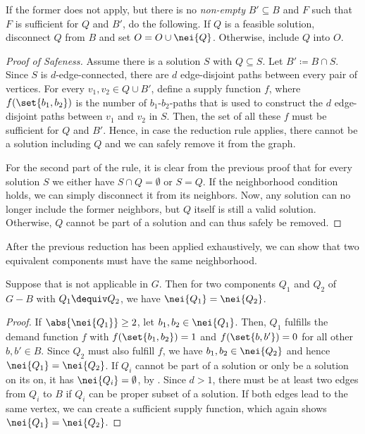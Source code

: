 \begin{lemma}
\begin{lemma}
\begin{lemma}
\begin{lemma}
\begin{lemma}
\begin{theorem}
\begin{reduction*}
\begin{reduction*}[$\star$]
  If the former does not apply, but there is no \emph{non-empty} $B' \subseteq B$ and $F$ such that $F$ is sufficient for $Q$ and $B'$, do the following. If $Q$ is a feasible solution, disconnect $Q$ from $B$ and set $O = O \cup \nei{Q}$. Otherwise, include $Q$ into $O$.
\end{reduction*}
\iflong
\begin{proof}[Proof of Safeness]
  Assume there is a solution $S$ with $Q \subseteq S$. Let $B' \coloneqq B \cap S$. Since $S$ is $d$-edge-connected, there are $d$ edge-disjoint paths between every pair of vertices. For every $v_1, v_2 \in Q \cup B'$, define a supply function $f$, where $f(\set{b_1, b_2})$ is the number of $b_1$-$b_2$-paths that is used to construct the $d$ edge-disjoint paths between $v_1$ and $v_2$ in $S$. Then, the set of all these $f$ must be sufficient for $Q$ and $B'$. Hence, in case the reduction rule applies, there cannot be a solution including $Q$ and we can safely remove it from the graph.

  For the second part of the rule, it is clear from the previous proof that for every solution $S$ we either have $S \cap Q = \emptyset$ or $S = Q$. If the neighborhood condition holds, we can simply disconnect it from its neighbors. Now, any solution can no longer include the former neighbors, but $Q$ itself is still a valid solution. Otherwise, $Q$ cannot be part of a solution and can thus safely be removed.
\end{proof}
\fi

After the previous reduction has been applied exhaustively, we can show that two equivalent components must have the same neighborhood.

\iflong
\begin{lemma}
\else
\begin{lemma}[$\star$]
\fi
\label{lem:similar_eq_nei}
  Suppose that  is not applicable in $G$. Then for two components $Q_1$ and $Q_2$ of $G-B$ with $Q_1 \dequiv Q_2$, we have $\nei{Q_1} = \nei{Q_2}$.
\end{lemma}
\iflong
\begin{proof}
  If $\abs{\nei{Q_1}} \ge 2$, let $b_1, b_2 \in \nei{Q_1}$. Then, $Q_1$ fulfills the demand function $f$ with $f(\set{b_1,b_2}) = 1$ and $f(\set{b,b'}) = 0$ for all other $b,b' \in B$. Since $Q_2$ must also fulfill $f$, we have $b_1, b_2 \in \nei{Q_2}$ and hence $\nei{Q_1} = \nei{Q_2}$. If $Q_i$ cannot be part of a solution or only be a solution on its on, it has $\nei{Q_i} = \emptyset$, by . Since $d > 1$, there must be at least two edges from $Q_i$ to $B$ if $Q_i$ can be proper subset of a solution. If both edges lead to the same vertex, we can create a sufficient supply function, which again shows $\nei{Q_1} = \nei{Q_2}$.
\end{proof}
\fi


\end{lemma}
\end{reduction*}
\end{theorem}
\end{lemma}
\end{lemma}
\end{lemma}
\end{lemma}
\end{lemma}
